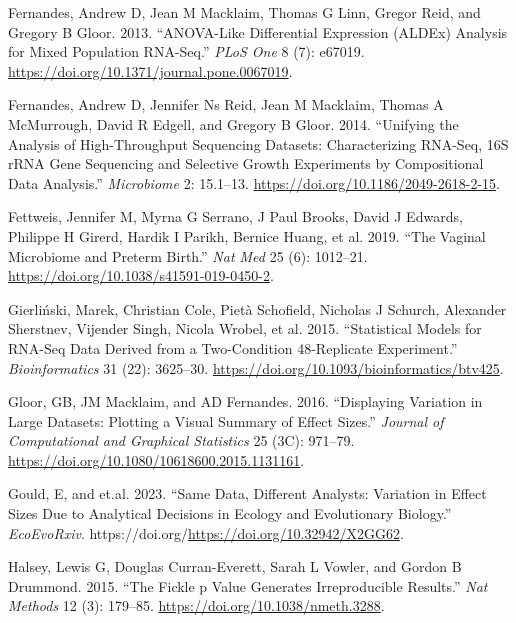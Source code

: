 \documentclass[
]{article}
\newlength{\cslhangindent}
\newlength{\cslentryspacingunit} %
\newenvironment{CSLReferences}[2] %
 {%
  \setlength{\parindent}{0pt}
  \ifodd #1
  \let\oldpar\par
  \def\par{\hangindent=\cslhangindent\oldpar}
  \fi
  \setlength{\parskip}{#2\cslentryspacingunit}
 }%
 {}
\begin{document}
\begin{CSLReferences}{1}{0}
\leavevmode{}%
Fernandes, Andrew D, Jean M Macklaim, Thomas G Linn, Gregor Reid, and
Gregory B Gloor. 2013. {``ANOVA-Like Differential Expression (ALDEx)
Analysis for Mixed Population RNA-Seq.''} \emph{PLoS One} 8 (7): e67019.
\url{https://doi.org/10.1371/journal.pone.0067019}.

\leavevmode{}%
Fernandes, Andrew D, Jennifer Ns Reid, Jean M Macklaim, Thomas A
McMurrough, David R Edgell, and Gregory B Gloor. 2014. {``Unifying the
Analysis of High-Throughput Sequencing Datasets: Characterizing
{RNA}-Seq, 16{S} r{RNA} Gene Sequencing and Selective Growth Experiments
by Compositional Data Analysis.''} \emph{Microbiome} 2: 15.1--13.
\url{https://doi.org/10.1186/2049-2618-2-15}.

\leavevmode{}%
Fettweis, Jennifer M, Myrna G Serrano, J Paul Brooks, David J Edwards,
Philippe H Girerd, Hardik I Parikh, Bernice Huang, et al. 2019. {``The
Vaginal Microbiome and Preterm Birth.''} \emph{Nat Med} 25 (6):
1012--21. \url{https://doi.org/10.1038/s41591-019-0450-2}.

\leavevmode{}%
Gierliński, Marek, Christian Cole, Pietà Schofield, Nicholas J Schurch,
Alexander Sherstnev, Vijender Singh, Nicola Wrobel, et al. 2015.
{``Statistical Models for RNA-Seq Data Derived from a Two-Condition
48-Replicate Experiment.''} \emph{Bioinformatics} 31 (22): 3625--30.
\url{https://doi.org/10.1093/bioinformatics/btv425}.

\leavevmode{}%
Gloor, GB, JM Macklaim, and AD Fernandes. 2016. {``Displaying Variation
in Large Datasets: Plotting a Visual Summary of Effect Sizes.''}
\emph{Journal of Computational and Graphical Statistics} 25 (3C):
971--79. \url{https://doi.org/10.1080/10618600.2015.1131161}.

\leavevmode{}%
Gould, E, and et.al. 2023. {``Same Data, Different Analysts: Variation
in Effect Sizes Due to Analytical Decisions in Ecology and Evolutionary
Biology.''} \emph{EcoEvoRxiv}.
https://doi.org/\url{https://doi.org/10.32942/X2GG62}.

\leavevmode{}%
Halsey, Lewis G, Douglas Curran-Everett, Sarah L Vowler, and Gordon B
Drummond. 2015. {``The Fickle p Value Generates Irreproducible
Results.''} \emph{Nat Methods} 12 (3): 179--85.
\url{https://doi.org/10.1038/nmeth.3288}.


\end{CSLReferences}
\end{document}
